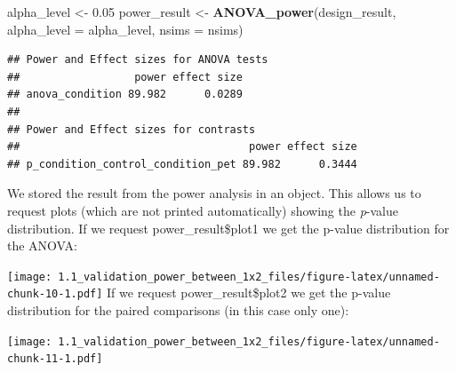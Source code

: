 \documentclass[]{article}
\newenvironment{Shaded}{\begin{snugshade}}{\end{snugshade}}
\newcommand{\KeywordTok}[1]{\textcolor[rgb]{0.13,0.29,0.53}{\textbf{#1}}}
\newcommand{\DataTypeTok}[1]{\textcolor[rgb]{0.13,0.29,0.53}{#1}}
\newcommand{\FloatTok}[1]{\textcolor[rgb]{0.00,0.00,0.81}{#1}}
\newcommand{\StringTok}[1]{\textcolor[rgb]{0.31,0.60,0.02}{#1}}
\newcommand{\OperatorTok}[1]{\textcolor[rgb]{0.81,0.36,0.00}{\textbf{#1}}}
\newcommand{\NormalTok}[1]{#1}
\begin{document}
\begin{Shaded}
\begin{Highlighting}[]
\NormalTok{alpha_level <-}\StringTok{ }\FloatTok{0.05}
\NormalTok{power_result <-}\StringTok{ }\KeywordTok{ANOVA_power}\NormalTok{(design_result, }\DataTypeTok{alpha_level =}\NormalTok{ alpha_level, }\DataTypeTok{nsims =}\NormalTok{ nsims)}
\end{Highlighting}
\end{Shaded}

\begin{verbatim}
## Power and Effect sizes for ANOVA tests
##                  power effect size
## anova_condition 89.982      0.0289
## 
## Power and Effect sizes for contrasts
##                                    power effect size
## p_condition_control_condition_pet 89.982      0.3444
\end{verbatim}

We stored the result from the power analysis in an object. This allows
us to request plots (which are not printed automatically) showing the
\emph{p}-value distribution. If we request power\_result\$plot1 we get
the p-value distribution for the ANOVA:

\begin{Shaded}
\end{Shaded}

\texttt{[image: 1.1\_validation\_power\_between\_1x2\_files/figure-latex/unnamed-chunk-10-1.pdf]}
If we request power\_result\$plot2 we get the p-value distribution for
the paired comparisons (in this case only one):

\begin{Shaded}
\end{Shaded}

\texttt{[image: 1.1\_validation\_power\_between\_1x2\_files/figure-latex/unnamed-chunk-11-1.pdf]}
\end{document}
